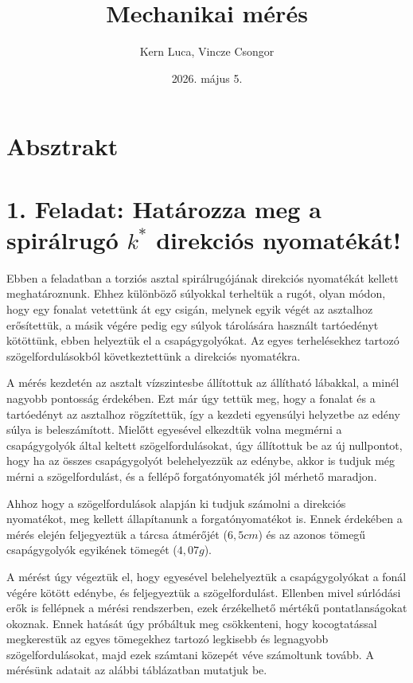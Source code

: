 \documentclass{article}
\title{Mechanikai mérés}
\author{Kern Luca, Vincze Csongor}
\date{2026. május 5.}
\begin{document}
\maketitle

\section*{Absztrakt}

\section*{1. Feladat: Határozza meg a spirálrugó $k^*$ direkciós nyomatékát!}

Ebben a feladatban a torziós asztal spirálrugójának direkciós nyomatékát kellett meghatároznunk. Ehhez különböző súlyokkal terheltük a rugót, olyan módon, hogy egy fonalat vetettünk át egy csigán, melynek egyik végét az asztalhoz erősítettük, a másik végére pedig egy súlyok tárolására használt tartóedényt kötöttünk, ebben helyeztük el a csapágygolyókat. Az egyes terhelésekhez tartozó szögelfordulásokból következtettünk a direkciós nyomatékra.

A mérés kezdetén az asztalt vízszintesbe állítottuk az állítható lábakkal, a minél nagyobb pontosság érdekében. Ezt már úgy tettük meg, hogy a fonalat és a tartóedényt az asztalhoz rögzítettük, így a kezdeti egyensúlyi helyzetbe az edény súlya is beleszámított. Mielőtt egyesével elkezdtük volna  megmérni a csapágygolyók által keltett szögelfordulásokat, úgy állítottuk be az új nullpontot, hogy ha az összes csapágygolyót belehelyezzük az edénybe, akkor is tudjuk még mérni a szögelfordulást, és a fellépő forgatónyomaték jól mérhető maradjon.

Ahhoz hogy a szögelfordulások alapján ki tudjuk számolni a direkciós nyomatékot, meg kellett állapítanunk a forgatónyomatékot is. Ennek érdekében a mérés elején feljegyeztük a tárcsa átmérőjét ($6,5 cm$) és az azonos tömegű csapágygolyók egyikének tömegét ($4,07 g$).

A mérést úgy végeztük el, hogy egyesével belehelyeztük a csapágygolyókat a fonál végére kötött edénybe, és feljegyeztük a szögelfordulást. Ellenben mivel súrlódási erők is fellépnek a mérési rendszerben, ezek érzékelhető mértékű pontatlanságokat okoznak. Ennek hatását úgy próbáltuk meg csökkenteni, hogy kocogtatással megkerestük az egyes tömegekhez tartozó legkisebb és legnagyobb szögelfordulásokat, majd ezek számtani közepét véve számoltunk tovább. A mérésünk adatait az alábbi táblázatban mutatjuk be.
\end{document}
